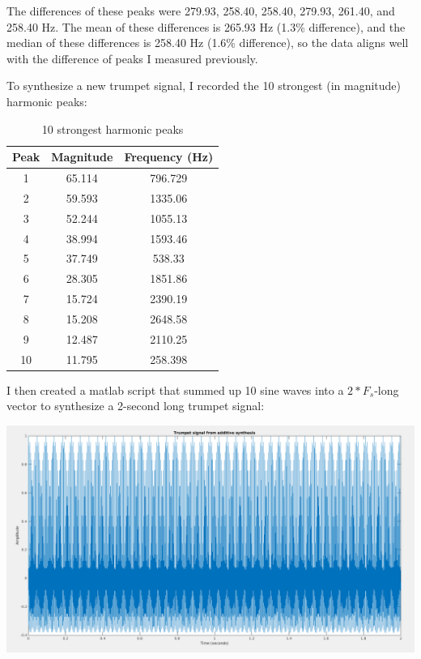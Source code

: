 \documentclass[11pt]{article}
\begin{document}
The differences of these peaks were 279.93, 258.40, 258.40, 279.93, 261.40, and 258.40 Hz.
The mean of these differences is 265.93 Hz (1.3\% difference), and the median of these differences is 258.40 Hz (1.6\% difference), so the data aligns well with the difference of peaks I measured previously.

To synthesize a new trumpet signal, I recorded the 10 strongest (in magnitude) harmonic peaks:

\begin{table}[H]
	\centering
	\begin{tabular}{c c c}\toprule
		Peak & Magnitude & Frequency (Hz) \\\midrule

		 1 & 65.114 & 796.729 \\
		 2 & 59.593 & 1335.06 \\
		 3 & 52.244 & 1055.13 \\
		 4 & 38.994 & 1593.46 \\
		 5 & 37.749 & 538.33  \\
		 6 & 28.305 & 1851.86 \\
		 7 & 15.724 & 2390.19 \\
		 8 & 15.208 & 2648.58 \\
		 9 & 12.487 & 2110.25 \\
		10 & 11.795 & 258.398 \\\bottomrule
	\end{tabular}
	\caption{\label{tab:strongest-harmonics}10 strongest harmonic peaks}
\end{table}

I then created a matlab script that summed up 10 sine waves into a $2*F_s$-long vector to synthesize a 2-second long trumpet signal:

\begin{framed}
	
\end{framed}

\includegraphics[scale=1.0]{signal_synthesis.png}
\end{document}
